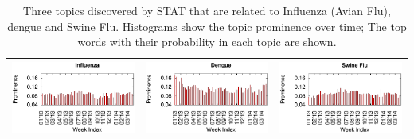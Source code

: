\documentclass[conference]{IEEEtran}
\newcommand{\model}{{STAT}\xspace} %
\begin{document}
\begin{table}[t]
\begin{center}
\caption{Three topics discovered by \model that are related to Influenza (Avian Flu), dengue and Swine Flu. Histograms show the topic prominence over time; The top words with their probability in each topic are shown.}
\begin{tabular}{|lr|lr|lr|}
\hline
\multicolumn{2}{|c|}{\includegraphics[clip,scale=0.45]{fig/topic_influenza_timeline.eps}} & \multicolumn{2}{|c|}{\includegraphics[clip,scale=0.45]{fig/topic_dengue_timeline.eps}}& 
\multicolumn{2}{|c|}{\includegraphics[clip,scale=0.45]{fig/topic_swine_timeline.eps}} \\ \hline

\end{tabular}
\end{center}
\end{table}
\end{document}
